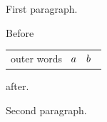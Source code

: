 \documentclass{article}
\begin{document}
First paragraph.

Before \begin{tabular}{l} outer words $\begin{array}{ll} a & b \end{array}$\end{tabular} after.

Second paragraph.
\end{document}
